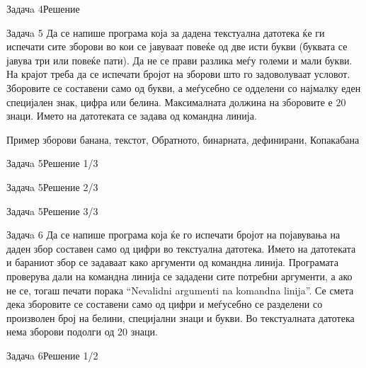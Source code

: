\begin{frame}[fragile]{Задачa 4}{Решение}

\end{frame}

\begin{frame}{Задачa 5}
Да се напише програма која за дадена текстуална датотека ќе ги испечати
сите зборови во кои се јавуваат повеќе од две исти букви (буквата се јавува три или
повеќе пати). Да не се прави разлика меѓу големи и мали букви. На крајот треба
да се испечати бројот на зборови што го задоволуваат условот. Зборовите се
составени само од букви, а меѓусебно се одделени со најмалку еден специјален
знак, цифра или белина. Максималната должина на зборовите е 20 знаци. Името на
датотеката се задава од командна линија. 
\begin{exampleblock}{Пример зборови}
банана, текстот, Обратното, бинарната, дефинирани, Копакабана
\end{exampleblock}
\end{frame}

\begin{frame}[fragile]{Задачa 5}{Решение 1/3}

\end{frame}

\begin{frame}[fragile]{Задачa 5}{Решение 2/3}

\end{frame}

\begin{frame}[fragile]{Задачa 5}{Решение 3/3}

\end{frame}

\begin{frame}{Задачa 6}
Да се напише програма која ќе го испечати бројот на појавувања на даден збор
составен само од цифри во текстуална датотека. Името на датотеката и бараниот
збор се задаваат како аргументи од командна линија. Програмата проверува дали на
командна линија се зададени сите потребни аргументи, а ако не се, тогаш печати
порака ``Nevalidni argumenti na komandna linija''. Се смета дека зборовите се
составени само од цифри и меѓусебно се разделени со произволен број на белини,
специјални знаци и букви. Во текстуалната датотека нема зборови подолги од 20
знаци.    
\end{frame}

\begin{frame}[fragile]{Задачa 6}{Решение 1/2}

\end{frame}

